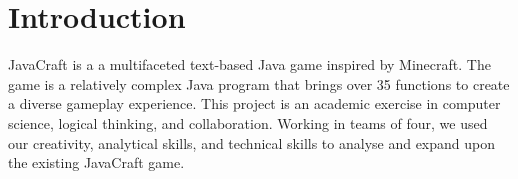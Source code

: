 \section{Introduction} \label{section: introduction}
JavaCraft is a a multifaceted text-based Java game inspired by Minecraft. The game is a relatively complex Java program that brings over 35 functions to create a diverse gameplay experience. This project is an academic exercise in computer science, logical thinking, and collaboration. Working in teams of four, we used our creativity, analytical skills, and technical skills to analyse and expand upon the existing JavaCraft game.